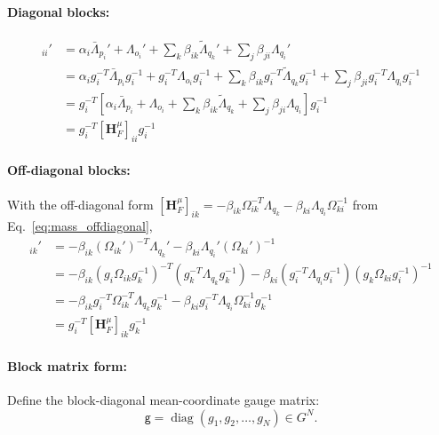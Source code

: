 \documentclass[12pt]{article}
\begin{document}
\paragraph{Diagonal blocks:}
\begin{align}
[\mathbf H_F^\mu]_{ii}' &= \alpha_i\bar{\Lambda}_{p_i}' + \Lambda_{o_i}' + \sum_k \beta_{ik}\tilde{\Lambda}_{q_k}' + \sum_j \beta_{ji}\Lambda_{q_i}' \nonumber\\
&= \alpha_i g_i^{-T}\bar{\Lambda}_{p_i} g_i^{-1} + g_i^{-T}\Lambda_{o_i}g_i^{-1} + \sum_k \beta_{ik} g_i^{-T}\tilde{\Lambda}_{q_k} g_i^{-1} + \sum_j \beta_{ji} g_i^{-T}\Lambda_{q_i} g_i^{-1} \nonumber\\
&= g_i^{-T} \left[\alpha_i\bar{\Lambda}_{p_i} + \Lambda_{o_i} + \sum_k \beta_{ik}\tilde{\Lambda}_{q_k} + \sum_j \beta_{ji}\Lambda_{q_i}\right] g_i^{-1} \nonumber\\
&= g_i^{-T} [\mathbf H_F^\mu]_{ii} g_i^{-1}
\end{align}

\paragraph{Off-diagonal blocks:}
With the off-diagonal form $[\mathbf H_F^\mu]_{ik}=-\beta_{ik}\Omega_{ik}^{-T}\Lambda_{q_k}-\beta_{ki}\Lambda_{q_i}\Omega_{ki}^{-1}$ from Eq.~\eqref{eq:mass_offdiagonal},
\begin{align}
[\mathbf H_F^\mu]_{ik}' &= -\beta_{ik}(\Omega_{ik}')^{-T}\Lambda_{q_k}' - \beta_{ki}\Lambda_{q_i}'(\Omega_{ki}')^{-1} \nonumber\\
&= -\beta_{ik}(g_i\Omega_{ik}g_k^{-1})^{-T}(g_k^{-T}\Lambda_{q_k} g_k^{-1}) - \beta_{ki}(g_i^{-T}\Lambda_{q_i} g_i^{-1})(g_k\Omega_{ki}g_i^{-1})^{-1} \nonumber\\
&= -\beta_{ik} g_i^{-T}\Omega_{ik}^{-T}\Lambda_{q_k} g_k^{-1} - \beta_{ki} g_i^{-T}\Lambda_{q_i}\Omega_{ki}^{-1} g_k^{-1} \nonumber\\
&= g_i^{-T} [\mathbf H_F^\mu]_{ik} g_k^{-1}
\end{align}

\paragraph{Block matrix form:}

Define the block-diagonal mean-coordinate gauge matrix:
\begin{equation}
\mathsf g=\operatorname{diag}(g_1,g_2,\ldots,g_N)\in G^N.
\end{equation}
\end{document}
